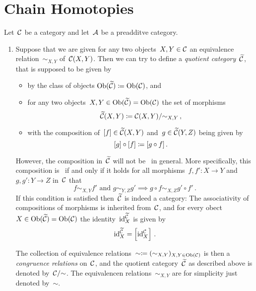 \section{Chain Homotopies}


\begin{remark*}
  \label{quotient categories}
  Let~$\mathcal{C}$ be a category and let~$\mathcal{A}$ be a preadditve category.
  \begin{enumerate}
    \item
      Suppose that we are given for any two objects~$X, Y \in \mathcal{C}$ an equivalence relation~$\sim_{X,Y}$ of~$\mathcal{C}(X,Y)$.
      Then we can try to define a \emph{quotient category}~$\widetilde{\mathcal{C}}$, that is supposed to be given by
      \begin{itemize}
        \item
          by the class of objects $\operatorname{Ob}(\widetilde{\mathcal{C}}) \coloneqq \operatorname{Ob}(\mathcal{C})$, and
        \item
          for any two objects~$X, Y \in \operatorname{Ob}(\widetilde{\mathcal{C}}) = \operatorname{Ob}(\mathcal{C})$ the set of morphisms
          \[
                      \widetilde{\mathcal{C}}(X,Y)
            \coloneqq  \mathcal{C}(X,Y)/{\sim_{X,Y}} \,,
          \]
        \item
          with the composition of~$[f] \in \widetilde{\mathcal{C}}(X,Y)$ and~$g \in \widetilde{\mathcal{C}}(Y,Z)$ being given by
          \[
                      [g] \circ [f]
            \coloneqq  [g \circ f] \,.
          \]
      \end{itemize}
      However, the composition in~$\widetilde{\mathcal{C}}$ will not be~{\welldef} in general.
      More specifically, this composition is~{\welldef} if and only if it holds for all morphisms~$f, f' \colon X \to Y$ and~$g, g' \colon Y \to Z$ in~$\mathcal{C}$ that
      \begin{equation}
        \label{definition of congruence relation}
        \text{$f \sim_{X,Y} f'$ and~$g \sim_{Y,Z} g'$}
        \implies
        g \circ f \sim_{X,Z} g' \circ f' \,.
      \end{equation}
      If this condition is satisfied then~$\widetilde{\mathcal{C}}$ is indeed a category:
      The associativity of compositions of morphisms is inherited from~$\mathcal{C}$, and for every obect~$X \in \operatorname{Ob}(\widetilde{\mathcal{C}}) = \operatorname{Ob}(\mathcal{C})$ the identity~$\operatorname{id}^{\widetilde{\mathcal{C}}}_X$ is given by
      \[
          \operatorname{id}^{\widetilde{\mathcal{C}}}_X
        = \left[ \operatorname{id}^{\mathcal{C}}_X \right] \,.
      \]
      
      The collection of equivalence relations~$\sim \coloneqq (\sim_{X,Y})_{X, Y \in \operatorname{Ob}(\mathcal{C})}$ is then a \emph{congruence relations} on~$\mathcal{C}$, and the quotient category~$\widetilde{\mathcal{C}}$ as described above is denoted by~$\mathcal{C}/{\sim}$.
      The equivalencen relations~$\sim_{X,Y}$ are for simplicity just denoted by~$\sim$.
      

\end{enumerate}
\end{remark*}
